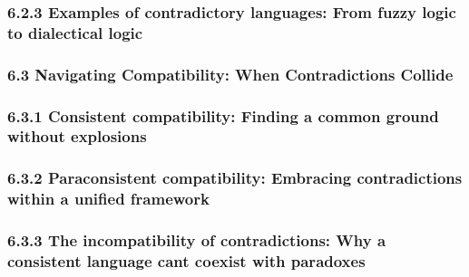 \hypertarget{examples-of-contradictory-languages-from-fuzzy-logic-to-dialectical-logic}{%
\subsubsection*{6.2.3 Examples of contradictory languages: From fuzzy
logic to dialectical
logic}\label{examples-of-contradictory-languages-from-fuzzy-logic-to-dialectical-logic}}

\hypertarget{navigating-compatibility-when-contradictions-collide}{%
\subsubsection*{\texorpdfstring{\textbf{6.3 Navigating Compatibility:
When Contradictions Collide}
}{6.3 Navigating Compatibility: When Contradictions Collide }}\label{navigating-compatibility-when-contradictions-collide}}

\hypertarget{consistent-compatibility-finding-a-common-ground-without-explosions}{%
\subsubsection*{\texorpdfstring{6.3.1 Consistent compatibility: Finding
a common ground without explosions
}{6.3.1 Consistent compatibility: Finding a common ground without explosions }}\label{consistent-compatibility-finding-a-common-ground-without-explosions}}

\hypertarget{paraconsistent-compatibility-embracing-contradictions-within-a-unified-framework}{%
\subsubsection*{\texorpdfstring{6.3.2 Paraconsistent compatibility:
Embracing contradictions within a unified framework
}{6.3.2 Paraconsistent compatibility: Embracing contradictions within a unified framework }}\label{paraconsistent-compatibility-embracing-contradictions-within-a-unified-framework}}

\hypertarget{the-incompatibility-of-contradictions-why-a-consistent-language-cant-coexist-with-paradoxes}{%
\subsubsection*{6.3.3 The incompatibility of contradictions: Why a
consistent language can\textquotesingle t coexist with
paradoxes}\label{the-incompatibility-of-contradictions-why-a-consistent-language-cant-coexist-with-paradoxes}}


